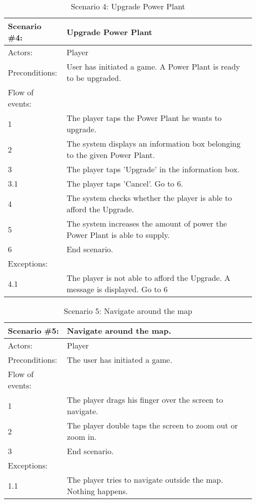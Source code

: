 \begin{table}
	\begin{tabular}{| l | p{10cm} |}
		\hline
		\rowcolor{lightgray}
		{\bf Scenario \#4:} & {\bf Upgrade Power Plant} \\ \hline
		Actors: & Player \\ \hline
		Preconditions: & User has initiated a game. A Power Plant is ready to be upgraded. \\ \hline
		\rowcolor{lightergray}
		Flow of events: & \\ \hline
		1 & The player taps the Power Plant he wants to upgrade. \\ \hline
		2 & The system displays an information box belonging to the given Power Plant. \\ \hline
		3 & The player taps 'Upgrade' in the information box. \\ \hline
		3.1 & The player taps 'Cancel'. Go to 6. \\ \hline
		4 & The system checks whether the player is able to afford the Upgrade. \\ \hline
		5 & The system increases the amount of power the Power Plant is able to supply. \\ \hline
		6 & End scenario. \\ \hline
		\rowcolor{lightergray}
		Exceptions: & \\ \hline
		4.1 & The player is not able to afford the Upgrade. A message is displayed. Go to 6 \\ \hline 
	\end{tabular}
\caption{Scenario 4: Upgrade Power Plant}
\end{table}

\begin{table}
	\begin{tabular}{| l | p{10cm} |}
		\hline
		\rowcolor{lightgray}
		{\bf Scenario \#5:} & {\bf Navigate around the map.} \\ \hline
		Actors: & Player \\ \hline
		Preconditions: & The user has initiated a game. \\ \hline
		\rowcolor{lightergray}
		Flow of events: & \\ \hline
		1 & The player drags his finger over the screen to navigate. \\ \hline
		2 & The player double taps the screen to zoom out or zoom in. \\ \hline
		3 & End scenario. \\ \hline
		\rowcolor{lightergray}
		Exceptions: & \\ \hline
		1.1 & The player tries to navigate outside the map. Nothing happens. \\ \hline
	\end{tabular}
	\caption{Scenario 5: Navigate around the map}
\end{table}

